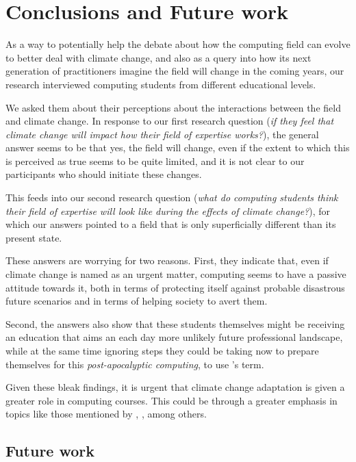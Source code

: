 
\section{Conclusions and Future work}
As a way to potentially help the debate about how the computing field can evolve to better deal with climate change, and also as a query into how its next generation of practitioners imagine the field will change in the coming years, our research interviewed computing students from different educational levels. 

We asked them about their perceptions about the interactions between the field and climate change. In response to our first research question (\emph{if they feel that climate change will impact how their field of expertise works?}), the general answer seems to be that yes, the field will change, even if the extent to which this is perceived as true seems to be quite limited, and it is not clear to our participants who should initiate these changes. 

This feeds into our second research question (\emph{what do computing students think their field of expertise will look like during the effects of climate change?}), for which our answers pointed to a field that is only superficially different than its present state.

These answers are worrying for two reasons. First, they indicate that, even if climate change is named as an urgent matter, computing seems to have a passive attitude towards it, both in terms of protecting itself against probable disastrous future scenarios and in terms of helping society to avert them. 

Second, the answers also show that these students themselves might be receiving an education that aims an each day more unlikely future professional landscape, while at the same time ignoring steps they could be taking now to prepare themselves for this \emph{post-apocalyptic computing}, to use \citeauthor{silberman2010precarious}'s term.

Given these bleak findings, it is urgent that climate change adaptation is given a greater role in computing courses. This could be through a greater emphasis in topics like those mentioned by \citeauthor{silberman2010precarious}, \citeauthor{easterbrook2010climate}, among others. 

\subsection{Future work} 


